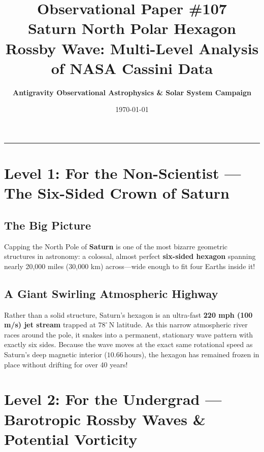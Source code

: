 \documentclass[11pt,a4paper]{article}
\title{\Huge \textbf{Observational Paper \#107}\\ \Large Saturn North Polar Hexagon Rossby Wave: Multi-Level Analysis of NASA Cassini Data}
\author{\textbf{Antigravity Observational Astrophysics \& Solar System Campaign}}
\date{\today}
\begin{document}
\maketitle

\vspace{-1em}
\begin{center}
\rule{\textwidth}{1.5pt}
\end{center}

\section*{Level 1: For the Non-Scientist — The Six-Sided Crown of Saturn}

\subsection*{The Big Picture}
Capping the North Pole of \textbf{Saturn} is one of the most bizarre geometric structures in astronomy: a colossal, almost perfect \textbf{six-sided hexagon} spanning nearly 20,000 miles (30,000 km) across—wide enough to fit four Earths inside it!

\subsection*{A Giant Swirling Atmospheric Highway}
Rather than a solid structure, Saturn's hexagon is an ultra-fast \textbf{220 mph (100 m/s) jet stream} trapped at $78^\circ\,\text{N}$ latitude. As this narrow atmospheric river races around the pole, it snakes into a permanent, stationary wave pattern with exactly six sides. Because the wave moves at the exact same rotational speed as Saturn's deep magnetic interior ($10.66\,\text{hours}$), the hexagon has remained frozen in place without drifting for over 40 years!

\newpage

\section*{Level 2: For the Undergrad — Barotropic Rossby Waves \& Potential Vorticity}
\end{document}
